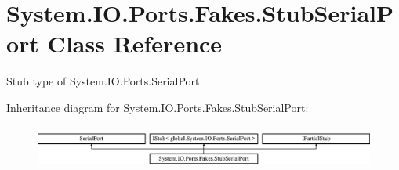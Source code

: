 \hypertarget{class_system_1_1_i_o_1_1_ports_1_1_fakes_1_1_stub_serial_port}{\section{System.\-I\-O.\-Ports.\-Fakes.\-Stub\-Serial\-Port Class Reference}
\label{class_system_1_1_i_o_1_1_ports_1_1_fakes_1_1_stub_serial_port}
}


Stub type of System.\-I\-O.\-Ports.\-Serial\-Port 


Inheritance diagram for System.\-I\-O.\-Ports.\-Fakes.\-Stub\-Serial\-Port\-:\begin{figure}[H]
\begin{center}
\leavevmode
\includegraphics[height=1.435897cm]{class_system_1_1_i_o_1_1_ports_1_1_fakes_1_1_stub_serial_port}
\end{center}
\end{figure}
